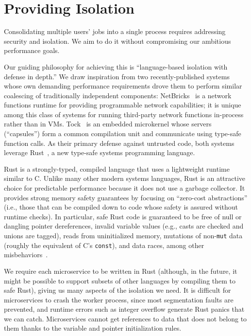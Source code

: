 \section{Providing Isolation}
\label{sec:isolation}

Consolidating multiple users' jobs into a single process requires
addressing security and isolation. We aim to do it without
compromising our ambitious performance goals.

Our guiding philosophy for achieving this is ``language-based isolation with defense
in depth.'' We draw inspiration from two recently-published systems whose own
demanding performance requirements drove them to perform similar coalescing of
traditionally independent components:  NetBricks~\cite{Panda2016} is a network
functions runtime for providing programmable network capabilities; it is unique among
this class of systems for running third-party network functions in-process rather
than in VMs.  Tock~\cite{Levy2017} is an embedded microkernel whose servers
(``capsules'') form a common compilation unit and communicate using type-safe
function calls.  As their primary defense against untrusted code, both systems
leverage Rust~\cite{www-rustlang}, a new type-safe systems programming language.


Rust is a strongly-typed, compiled language that uses a lightweight runtime
similar to C.  Unlike many other modern systems languages, Rust is an
attractive choice for predictable performance because it does not use
a garbage collector.  It provides strong memory safety
guarantees by focusing on ``zero-cost abstractions'' (i.e., those that can be
compiled down to code whose safety is assured without runtime checks).  In
particular, safe Rust code is guaranteed to be free of null or dangling pointer
dereferences, invalid variable values (e.g., casts are checked and unions are
tagged), reads from uninitialized memory, mutations of non-\texttt{mut} data (roughly
the equivalent of C's \texttt{const}), and data races, among other
misbehaviors~\cite{www-rustlang-ub}.

We require each microservice to be written in Rust (although, in the future, it
might be possible to support subsets of other languages by compiling them to safe
Rust), giving us many aspects of the isolation we need.  It is difficult for
microservices to crash the worker process, since most segmentation faults are
prevented, and runtime errors such as integer overflow generate Rust panics that we
can catch.  Microservices cannot get references to data that does not belong to them
thanks to the variable and pointer initialization rules.

